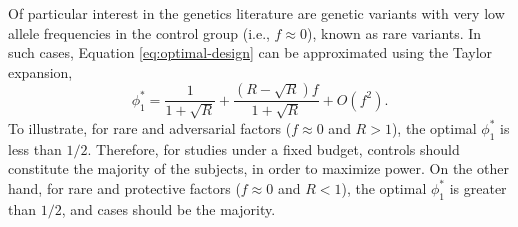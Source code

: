 Of particular interest in the genetics literature are genetic variants with very low allele frequencies in the control group (i.e., $f\approx 0$), known as rare variants.
In such cases, Equation \eqref{eq:optimal-design} can be approximated using the Taylor expansion,
\begin{equation} \label{eq:optimal-design-approx}
    \phi_1^* = \frac{1}{1 + \sqrt{R}} + \frac{(R-\sqrt{R})f}{1+\sqrt{R}} + O(f^2).
\end{equation}
To illustrate, for rare and adversarial factors ($f\approx0$ and $R>1$), the optimal $\phi_1^*$ is less than $1/2$.
Therefore, for studies under a fixed budget, controls should constitute the majority of the subjects, in order to maximize power.
On the other hand, for rare and protective factors ($f\approx0$ and $R<1$), the optimal $\phi_1^*$ is greater than $1/2$, and cases should be the majority.
